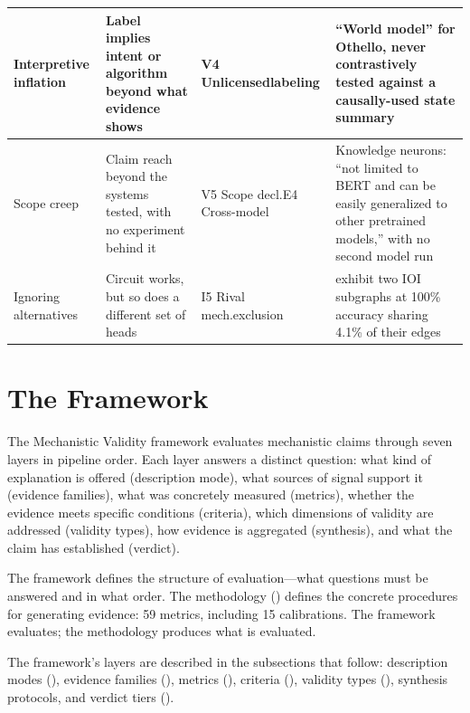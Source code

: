 \documentclass{article}
\begin{document}
\begin{table}[H]
\begin{tabular}{@{}l>{\raggedright\arraybackslash}p{3.2cm}>{\raggedright\arraybackslash}p{2.8cm}>{\raggedright\arraybackslash}p{4.0cm}@{}}
\midrule
Interpretive inflation & Label implies intent or algorithm beyond what evidence shows & V4 Unlicensed\newline labeling & ``World model'' for Othello, never contrastively tested against a causally-used state summary \\
\midrule
Scope creep & Claim reach beyond the systems tested, with no experiment behind it & V5 Scope decl.\newline E4 Cross-model & Knowledge neurons: ``not limited to BERT and can be easily generalized to other pretrained models,'' with no second model run \\
\midrule
\midrule
Ignoring alternatives & Circuit works, but so does a different set of heads & I5 Rival mech.\newline exclusion & \citet{chen2026circuits} exhibit two IOI subgraphs at 100\% accuracy sharing 4.1\% of their edges \\
\bottomrule
\end{tabular}
\end{table}
\endgroup


\section{The Framework}
\label{sec:framework}

The Mechanistic Validity framework evaluates mechanistic claims through seven layers in pipeline order. Each layer answers a distinct question: what kind of explanation is offered (description mode), what sources of signal support it (evidence families), what was concretely measured (metrics), whether the evidence meets specific conditions (criteria), which dimensions of validity are addressed (validity types), how evidence is aggregated (synthesis), and what the claim has established (verdict). 

The framework defines the structure of evaluation---what questions must be answered and in what order. The methodology () defines the concrete procedures for generating evidence: 59 metrics, including 15 calibrations. The framework evaluates; the methodology produces what is evaluated.

The framework's layers are described in the subsections that follow: description modes (), evidence families (), metrics (), criteria (), validity types (), synthesis protocols, and verdict tiers ().
\end{document}

